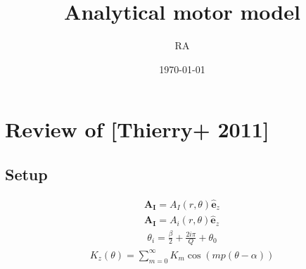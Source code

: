 \documentclass[a4paper, 11pt]{article}
\title{Analytical motor model}
\author{RA}
\date{\today}
\begin{document}
\maketitle
\section{Review of [Thierry+ 2011]}

\subsection{Setup}
\begin{align}\label{Eq: Therry_setup_vectorpotential}
    \bm{A_I} = A_I(r, \theta) \hat{\mathbf{e}}_{z}\\
    \bm{A_I} = A_i(r, \theta) \hat{\mathbf{e}}_{z}
\end{align}
\begin{align}
    \theta_i = \frac{\beta}{2} + \frac{2i\pi}{Q} + \theta_0
\end{align}
\begin{align}
    K_z(\theta) = \sum_{m=0}^\infty K_m \cos (mp(\theta-\alpha)) \label{Eq: Therry_setup_currentsheet}
\end{align}
\end{document}
